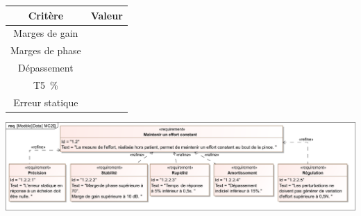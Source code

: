 \documentclass[10pt,fleqn]{article} %
\begin{document}
\begin{multicols}{2}
\begin{center}
\begin{tabular}{|c|c|}
\hline
Critère & Valeur \\ \hline
Marges de gain &  \\ \hline
Marges de phase &  \\ \hline
Dépassement &  \\ \hline
T5~\% &  \\ \hline
Erreur statique & \\ \hline
\end{tabular}
\end{center}
\ifprof
\begin{corrige}

\end{corrige}
\else
\fi


\end{multicols}


\ifprof
\else

\begin{center}
\includegraphics[width=\linewidth]{images/mc2e}
\end{center}
\fi
\end{document}
